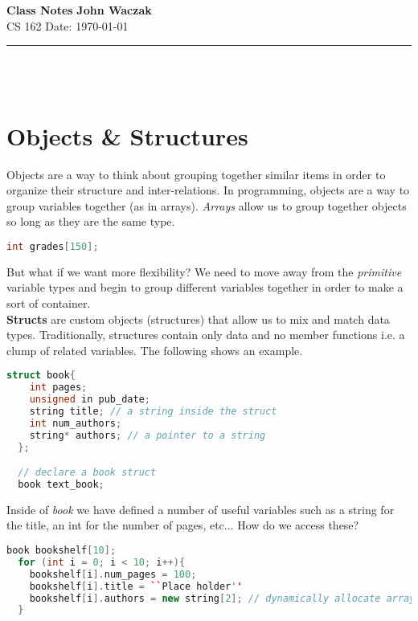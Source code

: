 \documentclass[a4paper, 11pt]{article}
\begin{document}
\noindent
\large\textbf{Class Notes} \hfill \textbf{John Waczak} \\
\normalsize CS 162 \hfill  Date: \today 
\par\noindent\rule{\textwidth}{0.4pt} \\\\



\section*{Objects \& Structures}
Objects are a way to think about grouping together similar items in order to
organize their structure and inter-relations. In programming, objects are a way
to group variables together (as in arrays). \textit{Arrays} allow us to group
together objects so long as they are the same type.

\begin{lstlisting}[language=C++]
  int grades[150]; 
\end{lstlisting}
But what if we want more flexibility? We need to move away from the
\textit{primitive} variable types and begin to group different variables
together in order to make a sort of container.\\ 

\textbf{Structs} are custom objects (structures) that allow us to mix and match
data types. Traditionally, structures contain only data and no member functions
i.e. a clump of related variables. The following shows an example. \\


\begin{lstlisting}[language=C++]
  struct book{
    int pages;
    unsigned in pub_date;
    string title; // a string inside the struct
    int num_authors;
    string* authors; // a pointer to a string
  };

  // declare a book struct
  book text_book; 
\end{lstlisting}
\vspace{1em}

Inside of \textit{book} we have defined a number of useful variables such as a
string for the title, an int for the number of pages, etc... How do we access
these?


\begin{lstlisting}[language=C++]
  book bookshelf[10];
  for (int i = 0; i < 10; i++){
    bookshelf[i].num_pages = 100;
    bookshelf[i].title = ``Place holder''
    bookshelf[i].authors = new string[2]; // dynamically allocate array 
  }
\end{lstlisting}
\end{document}
